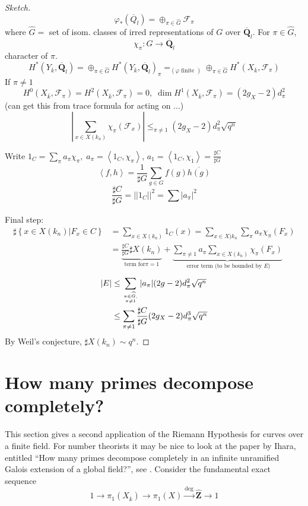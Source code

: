 \begin{proof}[Sketch]
$$
\varphi_*(\overline Q_l) = \oplus_{\pi\in \widehat G}
\mathcal{F}_{\pi}
$$
where $\widehat G = $ set of isom. classes of irred representations of
$G$ over $\overline{\mathbf{Q}}_l$. For $\pi\in \widehat G$,
$$
\chi_{\pi}: G\to\overline{\mathbf{Q}}_l
$$
character of $\pi$.
$$
H^*(Y_{\overline k}, \overline{\mathbf{Q}}_l) =
\oplus_{\pi\in \widehat G}
H^*(Y_{\overline k}, \overline{\mathbf{Q}}_l)_\pi
=_{(\varphi\text{ finite })}
\oplus_{\pi\in \widehat G}
H^*(X_{\overline k}, \mathcal{F}_\pi)
$$
If $\pi\neq 1$
$$
H^0(X_{\overline k},\mathcal{F}_\pi) = H^2(X_{\overline k},
\mathcal{F}_\pi)=0, \; \dim H^1(X_{\overline k}, \mathcal{F}_\pi) =
(2g_X-2)d_\pi^2
$$
(can get this from trace formula for acting on ...)
$$
\left|\sum_{x\in X(k_n)}\chi_\pi(\mathcal{F}_x)\right|\leq_{\pi\neq
1} (2g_X-2)d_\pi^2\sqrt{q^n}
$$

Write $1_C = \sum_\pi a_\pi\chi_\pi, \; a_\pi=\left<1_C,
\chi_\pi\right>$, $a_1 = \left<1_C, \chi_1\right> = \frac{\sharp C}{\sharp G}$
$$
\left<f, h\right> = \frac{1}{\sharp G}\sum_{g\in
G}f(g)\overline{h(g)}
$$
$$
\frac{\sharp C}{\sharp G} = ||1_C||^2 = \sum|a_\pi|^2
$$

\noindent
Final step:
\begin{align*}
\sharp\left\{x\in X(k_n)\left| F_x\in C\right.\right\}&=\sum_{x\in
X(k_n)}1_C(x) = \sum_{x\in X)k_n}\sum_{\pi}a_\pi\chi_\pi(F_x)\\
&=\underbrace{\frac{\sharp C}{\sharp G}\sharp X(k_n)}_{\text{term for
}\pi=1}+\underbrace{\sum_{\pi\neq 1}a_\pi\sum_{x\in
X(k_n)}\chi_\pi(F_x)}_{\text{ error term (to be bounded by $E$)}}
\end{align*}
\begin{align*}
|E|&\leq \sum_{\pi\in \widehat G, \atop \pi\neq
1}|a_\pi|(2g-2)d_\pi^2\sqrt{q^n}\\
&\leq \sum_{\pi\neq 1} \frac{\sharp C}{\sharp G}
(2g_X-2)d_\pi^3\sqrt{q^n}
\end{align*}
By Weil's conjecture, $\sharp X(k_n)\sim q^n$.
\end{proof}



\section{How many primes decompose completely?}
\label{section-how-many}

\noindent
This section gives a second application of the Riemann Hypothesis for
curves over a finite field. For number theorists it may be nice
to look at the paper by Ihara, entitled
``How many primes decompose completely in an infinite unramified Galois
extension of a global field?'', see \cite{Ihara}.
Consider the fundamental exact sequence
$$
1 \to
\pi_1(X_{\overline k}) \to
\pi_1(X) \xrightarrow{\deg}
\widehat{\mathbf{Z}} \to 1
$$

